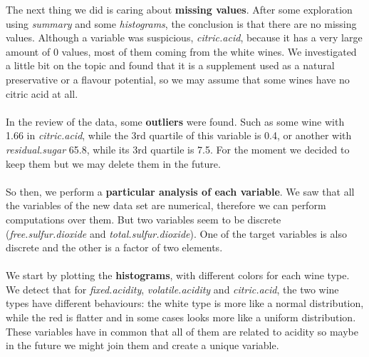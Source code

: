 \documentclass[10pt]{article}
\begin{document}
The next thing we did is caring about \textbf{missing values}. After some exploration using \textit{summary} and some \textit{histograms}, the conclusion is that there are no missing values. Although a variable was suspicious, \textit{citric.acid}, because it has a very large amount of 0 values, most of them coming from the white wines. We investigated a little bit on the topic and found that it is a supplement used as a natural preservative or a flavour potential, so we may assume that some wines have no citric acid at all. \\ \ \\
In the review of the data, some \textbf{outliers} were found. Such as some wine with 1.66 in \textit{citric.acid}, while the 3rd quartile of this variable is 0.4, or another with \textit{residual.sugar} 65.8, while its 3rd quartile is 7.5. For the moment we decided to keep them but we may delete them in the future. \\ \ \\
So then, we perform a \textbf{particular analysis of each variable}. We saw that all the variables of the new data set are numerical, therefore we can perform computations over them. But two variables seem to be discrete (\textit{free.sulfur.dioxide} and \textit{total.sulfur.dioxide}). One of the target variables is also discrete and the other is a factor of two elements. \\ \ \\
We start by plotting the \textbf{histograms}, with different colors for each wine type. We detect that for \textit{fixed.acidity}, \textit{volatile.acidity} and \textit{citric.acid}, the two wine types have different behaviours: the white type is more like a normal distribution, while the red is flatter and in some cases looks more like a uniform distribution. These variables have in common that all of them are related to acidity so maybe in the future we might join them and create a unique variable. \\
\end{document}

